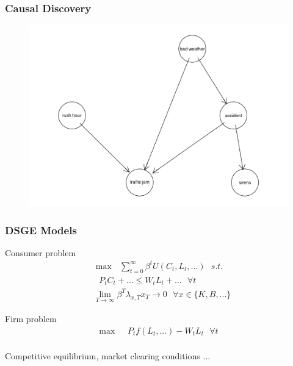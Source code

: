 \documentclass{beamer}
\begin{document}
\begin{frame}
    \frametitle{Causal Discovery}
    \begin{figure}
        \includegraphics[height=0.8\textheight]{images/trafficjam.png}
    \end{figure}
\end{frame}

\begin{frame}
    \frametitle{DSGE Models}
    \begin{minipage}{0.4\textwidth}
        \centering
        Consumer problem
        \begin{align*}
            & \max \text{ } \sum_{t=0}^{\infty} \beta^t U(C_t, L_t, ...) \text{ } s.t. \\
            & \text{ } P_t C_t + ... \leq W_t L_t + ... \text{ } \forall t \\
            & \lim_{T \rightarrow \infty} \beta^T \lambda_{x,T} x_T \rightarrow 0 \text{ } \forall x \in \{K, B, ...\}
        \end{align*}
    \end{minipage}
    \begin{minipage}{0.4\textwidth}
        \centering
        Firm problem
        \begin{align*}
            \max \text{ } & P_t f(L_t, ...) - W_t L_t \text{ } \forall t \\
        \end{align*}
    \end{minipage}
    \vskip 1cm
    \centering
    Competitive equilibrium, market clearing conditions ...
\end{frame}
\end{document}
